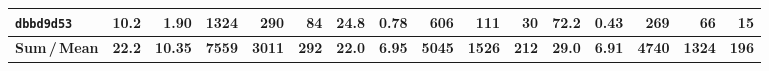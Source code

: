 \documentclass[10pt]{article}
\begin{document}
\begin{longtable}{@{}
    l
    | r r r r r
    | r r r r r
    | r r r r r
  @{}}
\texttt{dbbd9d53}
  & 10.2 & 1.90 & 1324 & 290 &  84
  & 24.8 & 0.78 & 606  & 111 &  30
  & \textbf{72.2} & 0.43 & 269 &  66 &  15 \\

\midrule
\rowcolor{totalbg}
\textbf{Sum\,/\,Mean}
  & \textbf{22.2} & \textbf{10.35} & \textbf{7559}  & \textbf{3011} & \textbf{292}
  & \textbf{22.0} & \textbf{6.95}  & \textbf{5045}  & \textbf{1526} & \textbf{212}
  & \textbf{29.0} & \textbf{6.91}  & \textbf{4740}  & \textbf{1324} & \textbf{196} \\

\end{longtable}
\end{document}
